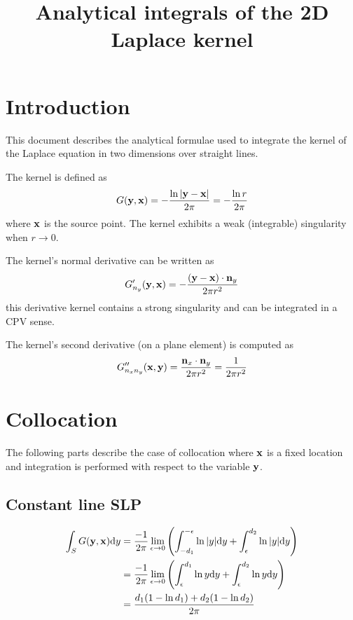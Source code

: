 \documentclass[a4paper,11pt]{article}
\title {Analytical integrals of the 2D Laplace kernel}
\newcommand{\td}{\mathrm{d}}
\begin{document}
\maketitle

\section{Introduction}

This document describes the analytical formulae used to integrate the kernel of the Laplace equation in two dimensions over straight lines.

The kernel is defined as
%
\begin{equation}
G({\bf y}, {\bf x}) = -\frac{\ln |{\bf y}-{\bf x}|}{2\pi} = -\frac{\ln r}{2\pi}
\end{equation}
%
where ${\bf x}$ is the source point. The kernel exhibits a weak (integrable) singularity when $r \to 0$.

The kernel's normal derivative can be written as
%
\begin{equation}
G'_{n_y}({\bf y}, {\bf x}) = -\frac{({\bf y}-{\bf x}) \cdot {\bf n}_y}{2\pi r^2}
\end{equation}
%
this derivative kernel contains a strong singularity and can be integrated in a CPV sense.

The kernel's second derivative (on a plane element) is computed as
%
\begin{equation}
G''_{n_x n_y}({\bf x}, {\bf y}) = \frac{{\bf n}_x \cdot {\bf n}_y}{2\pi r^2} = \frac{1}{2\pi r^2}
\end{equation}


\section{Collocation}

The following parts describe the case of collocation where ${\bf x}$ is a fixed location and integration is performed with respect to the variable ${\bf y}$.

\subsection{Constant line SLP}

\begin{align}
\int_{S} G({\bf y}, {\bf x}) \td y
& = \frac{-1}{2\pi}\lim_{\epsilon \to 0}
\left( \int_{-d_1}^{-\epsilon} \ln |y| \td y + \int_{\epsilon}^{d_2}  \ln |y| \td y \right) \nonumber \\
& = \frac{-1}{2\pi}\lim_{\epsilon \to 0}
\left( \int_{\epsilon}^{d_1} \ln y \td y + \int_{\epsilon}^{d_2}  \ln y \td y \right) \nonumber \\
&=
\frac{d_1(1-\ln d_1) + d_2(1-\ln d_2)}{2\pi}
\end{align}
\end{document}
